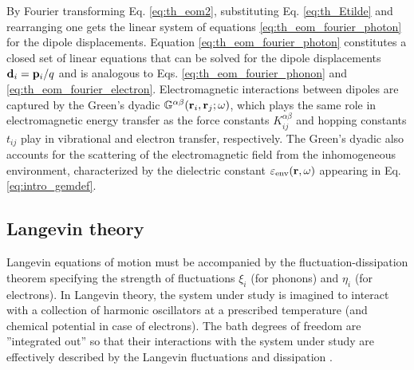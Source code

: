By Fourier transforming Eq. \eqref{eq:th_eom2}, substituting Eq. \eqref{eq:th_Etilde} and rearranging one gets the linear system of equations \eqref{eq:th_eom_fourier_photon} for the dipole displacements.
Equation \eqref{eq:th_eom_fourier_photon} constitutes a closed set of linear equations that can be solved for the dipole displacements $\mathbf{d}_i=\mathbf{p}_i/q$ and is analogous to Eqs. \eqref{eq:th_eom_fourier_phonon} and \eqref{eq:th_eom_fourier_electron}. Electromagnetic interactions between dipoles are captured by the Green's dyadic $\mathbb{G}^{\alpha\beta}(\mathbf{r}_i,\mathbf{r}_j;\omega)$, which plays the same role in electromagnetic energy transfer as the force constants $K_{ij}^{\alpha\beta}$ and hopping constants $t_{ij}$ play in vibrational and electron transfer, respectively. The Green's dyadic also accounts for the scattering of the electromagnetic field from the inhomogeneous environment, characterized by the dielectric constant $\varepsilon_{\textrm{env}}(\mathbf{r},\omega)$ appearing in Eq. \eqref{eq:intro_gemdef}.




\subsection{Langevin theory}
\label{sec:th_langevin}
Langevin equations of motion must be accompanied by the fluctuation-dissipation theorem specifying the strength of fluctuations $\xi_i$ (for phonons) and $\eta_i$ (for electrons). In Langevin theory, the system under study is imagined to interact with a collection of harmonic oscillators at a prescribed temperature (and chemical potential in case of electrons). The bath degrees of freedom are ''integrated out'' so that their interactions with the system under study are effectively described by the Langevin fluctuations and dissipation \cite{weiss}. 

